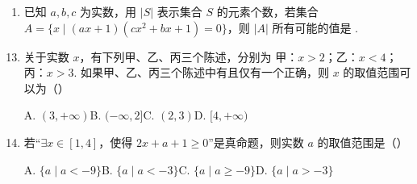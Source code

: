 \documentclass[a4paper,11pt]{article}
\begin{document}
\begin{enumerate}
\fi

\item 已知 $a,b,c$ 为实数，用 $|S|$ 表示集合 $S$ 的元素个数，若集合 $A=\{x\mid (ax+1)(cx^2+bx+1)=0\}$，则 $|A|$ 所有可能的值是 \blankline[5em].


\end{enumerate}


\begin{enumerate}
\setcounter{enumi}{12}

\item 关于实数 $x$，有下列甲、乙、丙三个陈述，分别为 甲：$x>2$；乙：$x<4$；丙：$x>3$. 如果甲、乙、丙三个陈述中有且仅有一个正确，则 $x$ 的取值范围可以为（\quad）

A. $(3,+\infty)$\qquad B. $(-\infty,2]$\qquad C. $(2,3)$\qquad D. $[4,+\infty)$


\ifanswer
\solbegin
{}
\solend

\fi

\item 若“$\exists x\in[1,4]$，使得 $2x+a+1\geqslant 0$”是真命题，则实数 $a$ 的取值范围是（\quad）

A. $\{a\mid a<-9\}$\qquad B. $\{a\mid a<-3\}$\qquad C. $\{a\mid a\geqslant -9\}$\qquad D. $\{a\mid a>-3\}$


\ifanswer
\solbegin
{}
\solend


\end{enumerate}
\end{document}
